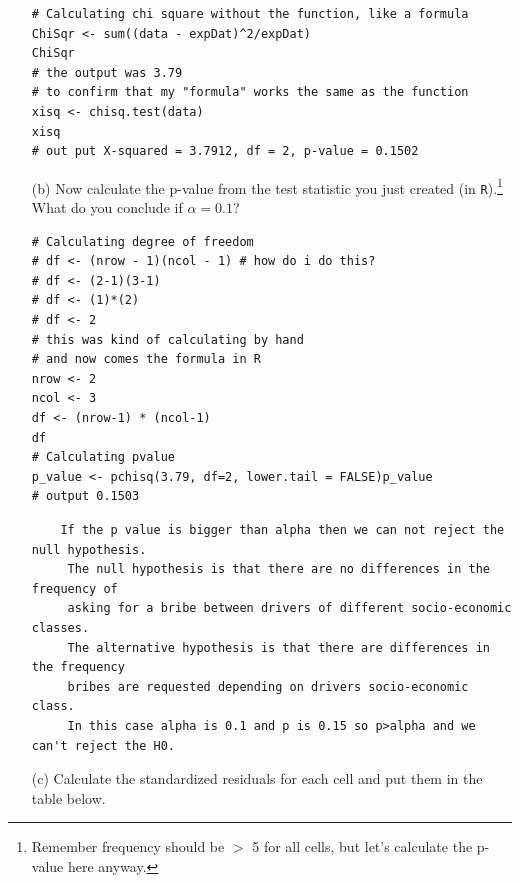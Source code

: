 \documentclass[12pt,letterpaper]{article}
\begin{document}
\begin{enumerate}
\begin{lstlisting}
# Calculating chi square without the function, like a formula 
ChiSqr <- sum((data - expDat)^2/expDat)
ChiSqr
# the output was 3.79
# to confirm that my "formula" works the same as the function
xisq <- chisq.test(data)
xisq
# out put X-squared = 3.7912, df = 2, p-value = 0.1502
\end{lstlisting}

	\item [(b)]
	Now calculate the p-value from the test statistic you just created (in \texttt{R}).\footnote{Remember frequency should be $>$ 5 for all cells, but let's calculate the p-value here anyway.}  What do you conclude if $\alpha = 0.1$?\\
	
\begin{lstlisting}
# Calculating degree of freedom
# df <- (nrow - 1)(ncol - 1) # how do i do this?
# df <- (2-1)(3-1)
# df <- (1)*(2)
# df <- 2
# this was kind of calculating by hand
# and now comes the formula in R
nrow <- 2
ncol <- 3
df <- (nrow-1) * (ncol-1)
df
# Calculating pvalue
p_value <- pchisq(3.79, df=2, lower.tail = FALSE)p_value
# output 0.1503
	\end{lstlisting}
	
\begin{verbatim}
	If the p value is bigger than alpha then we can not reject the null hypothesis.
	 The null hypothesis is that there are no differences in the frequency of 
	 asking for a bribe between drivers of different socio-economic classes. 
	 The alternative hypothesis is that there are differences in the frequency 
	 bribes are requested depending on drivers socio-economic class. 
	 In this case alpha is 0.1 and p is 0.15 so p>alpha and we can't reject the H0.
\end{verbatim}
	
	\newpage
	\item [(c)] Calculate the standardized residuals for each cell and put them in the table below.
	\vspace{1cm}
	

\end{enumerate}
\end{document}
